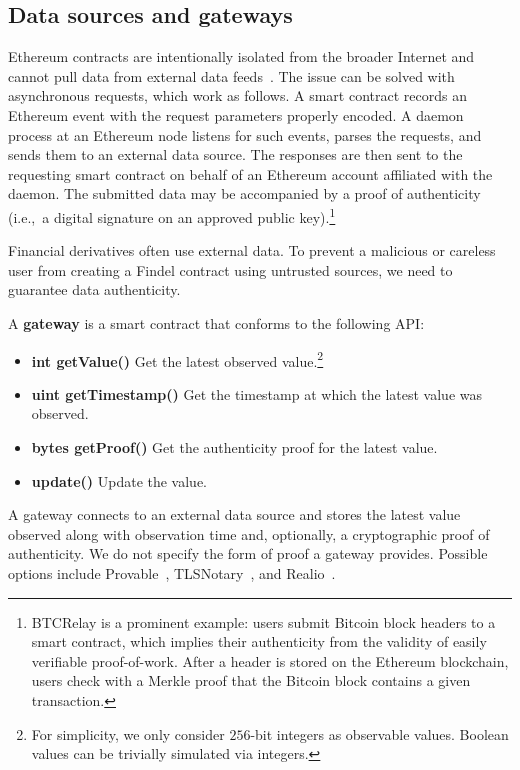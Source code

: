 \subsection{Data sources and gateways} \label{def:Ch10FindelGateways}

Ethereum contracts are intentionally isolated from the broader Internet and cannot pull data from external data feeds~\cite{Greenspan2016}.
The issue can be solved with asynchronous requests, which work as follows.
A smart contract records an Ethereum event with the request parameters properly encoded.
A daemon process at an Ethereum node listens for such events, parses the requests, and sends them to an external data source.
The responses are then sent to the requesting smart contract on behalf of an Ethereum account affiliated with the daemon.
The submitted data may be accompanied by a proof of authenticity (i.e.,~a digital signature on an approved public key).\footnote{BTCRelay is a prominent example: users submit Bitcoin block headers to a smart contract, which implies their authenticity from the validity of easily verifiable proof-of-work. After a header is stored on the Ethereum blockchain, users check with a Merkle proof that the Bitcoin block contains a given transaction.}

Financial derivatives often use external data.
To prevent a malicious or careless user from creating a Findel contract using untrusted sources, we need to guarantee data authenticity.

\begin{definition}
	A \textbf{gateway} is a smart contract that conforms to the following API:
	
	\begin{itemize}
		\item \textbf{int getValue()} Get the latest observed value.\footnote{For simplicity, we only consider $256$-bit integers as observable values. Boolean values can be trivially simulated via integers.}
		\item \textbf{uint getTimestamp()} Get the timestamp at which the latest value was observed.
		\item \textbf{bytes getProof()} Get the authenticity proof for the latest value.
		\item \textbf{update()} Update the value.
	\end{itemize}
	
\end{definition}

A gateway connects to an external data source and stores the latest value observed along with observation time and, optionally, a cryptographic proof of authenticity.
We do not specify the form of proof a gateway provides.
Possible options include Provable~\cite{Provable}, TLSNotary~\cite{TLSNotary}, and Realio~\cite{Realitio}.

